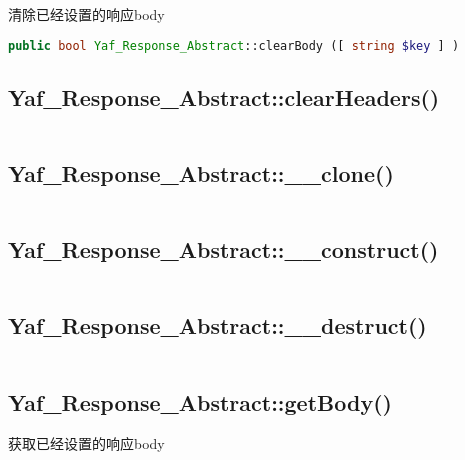清除已经设置的响应body

\begin{lstlisting}[language=PHP]
public bool Yaf_Response_Abstract::clearBody ([ string $key ] )
\end{lstlisting}



\subsection{Yaf\_Response\_Abstract::clearHeaders()}



\begin{lstlisting}[language=PHP]

\end{lstlisting}
\subsection{Yaf\_Response\_Abstract::\_\_clone()}


\begin{lstlisting}[language=PHP]

\end{lstlisting}


\subsection{Yaf\_Response\_Abstract::\_\_construct()}


\begin{lstlisting}[language=PHP]

\end{lstlisting}

\subsection{Yaf\_Response\_Abstract::\_\_destruct()}


\begin{lstlisting}[language=PHP]

\end{lstlisting}

\subsection{Yaf\_Response\_Abstract::getBody()}

获取已经设置的响应body


\begin{lstlisting}[language=PHP]

\end{lstlisting}

